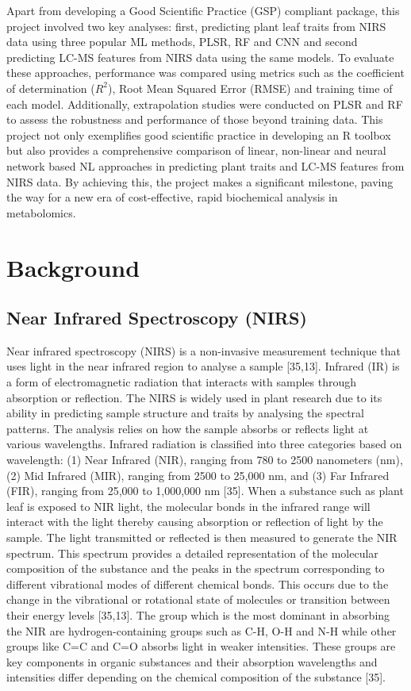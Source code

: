 \documentclass[12pt,a4paper]{report}
\begin{document}
Apart from developing a Good Scientific Practice (GSP) compliant package, this project involved two key analyses: first, predicting plant leaf traits from NIRS data using three popular ML methods, PLSR, RF and CNN and second predicting LC-MS features from NIRS data using the same models. To evaluate these approaches, performance was compared using metrics such as the coefficient of determination ($R^2$), Root Mean Squared Error (RMSE) and training time of each model. Additionally,
extrapolation studies were conducted on PLSR and RF to assess the robustness and performance of those beyond training data. This project not only exemplifies good scientific practice in developing an R toolbox but also provides a comprehensive comparison of linear, non-linear and neural network based NL approaches in predicting plant traits and LC-MS features from NIRS data. By achieving this, the project makes a significant milestone, paving the way for a new era of cost-effective, rapid biochemical analysis in metabolomics. \\



\chapter{Background}

\section{Near Infrared Spectroscopy (NIRS)}
Near infrared spectroscopy (NIRS) is a non-invasive measurement technique that uses light in the near infrared region to analyse a sample [35,13]. Infrared (IR) is a form of electromagnetic radiation that interacts with samples through absorption or reflection. The NIRS is widely used in plant research due to its ability in predicting sample structure and traits by analysing the spectral patterns. The analysis relies on how the sample absorbs or reflects light at various wavelengths. 
Infrared radiation is classified into three categories based on wavelength: (1) Near Infrared (NIR), ranging from 780 to 2500 nanometers (nm), (2) Mid Infrared (MIR), ranging from 2500 to 25,000 nm, and (3) Far Infrared (FIR), ranging from 25,000 to 1,000,000 nm [35]. When a substance such as plant leaf is exposed to NIR light, the molecular bonds in the infrared range will interact with the light thereby causing absorption or reflection of light by the sample. The light transmitted 
or reflected is then measured to generate the NIR spectrum. This spectrum provides a detailed representation of the molecular composition of the substance and the peaks in the spectrum corresponding to different vibrational modes of different chemical bonds. This occurs due to the change in the vibrational or rotational state of molecules or transition between their energy levels [35,13]. The group which is the most dominant in absorbing the NIR are hydrogen-containing groups such as 
C-H, O-H and N-H while other groups like C=C and C=O absorbs light in weaker intensities. These groups are key components in organic substances and their absorption wavelengths and intensities differ depending on the chemical composition of the substance [35]. \\ 
\end{document}
